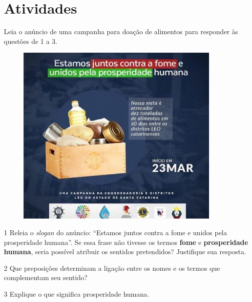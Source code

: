 \pagebreak
\section{Atividades}

Leia o anúncio de uma campanha para doação de alimentos para responder às questões de 1 a 3.



\begin{figure}[htpb!]
\centering
\includegraphics[width=.8\textwidth]{./_SAEB_9_POR/media/image31.jpeg}
\end{figure}

\num{1} Releia o \emph{slogan} do anúncio: ``Estamos juntos contra a
fome e unidos pela prosperidade humana''. Se essa frase não tivesse os
termos \textbf{fome} e \textbf{prosperidade humana}, seria possível
atribuir os sentidos pretendidos? Justifique sua resposta.


\num{2} Que preposições determinam a ligação entre os nomes e os termos
que complementam seu sentido?


\num{3} Explique o que significa prosperidade humana.


